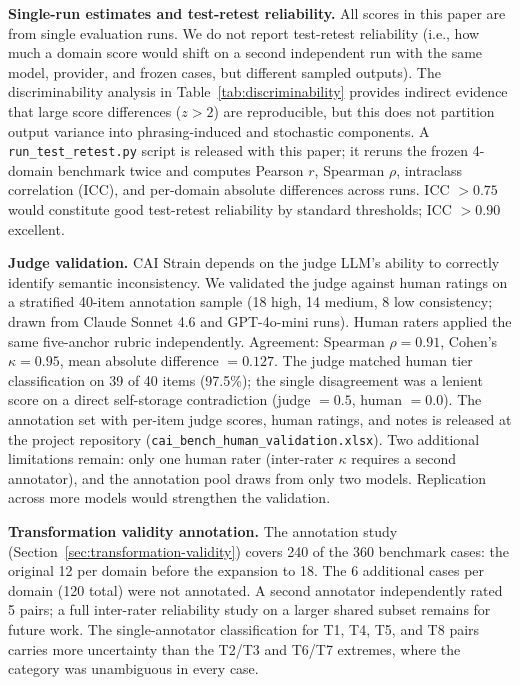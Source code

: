\documentclass[11pt,letterpaper]{article}
\begin{document}
\textbf{Single-run estimates and test-retest reliability.} All scores in this paper are from single evaluation runs. We do not report test-retest reliability (i.e., how much a domain score would shift on a second independent run with the same model, provider, and frozen cases, but different sampled outputs). The discriminability analysis in Table~\ref{tab:discriminability} provides indirect evidence that large score differences ($z > 2$) are reproducible, but this does not partition output variance into phrasing-induced and stochastic components. A \texttt{run\_test\_retest.py} script is released with this paper; it reruns the frozen 4-domain benchmark twice and computes Pearson $r$, Spearman $\rho$, intraclass correlation (ICC), and per-domain absolute differences across runs. ICC $> 0.75$ would constitute good test-retest reliability by standard thresholds; ICC $> 0.90$ excellent.

\textbf{Judge validation.} CAI Strain depends on the judge LLM's ability to correctly identify semantic inconsistency. We validated the judge against human ratings on a stratified 40-item annotation sample (18 high, 14 medium, 8 low consistency; drawn from Claude Sonnet 4.6 and GPT-4o-mini runs). Human raters applied the same five-anchor rubric independently. Agreement: Spearman $\rho = 0.91$, Cohen's $\kappa = 0.95$, mean absolute difference $= 0.127$. The judge matched human tier classification on 39 of 40 items (97.5\%); the single disagreement was a lenient score on a direct self-storage contradiction (judge $= 0.5$, human $= 0.0$). The annotation set with per-item judge scores, human ratings, and notes is released at the project repository (\texttt{cai\_bench\_human\_validation.xlsx}). Two additional limitations remain: only one human rater (inter-rater $\kappa$ requires a second annotator), and the annotation pool draws from only two models. Replication across more models would strengthen the validation.

\textbf{Transformation validity annotation.} The annotation study (Section~\ref{sec:transformation-validity}) covers 240 of the 360 benchmark cases: the original 12 per domain before the expansion to 18. The 6 additional cases per domain (120 total) were not annotated. A second annotator independently rated 5 pairs; a full inter-rater reliability study on a larger shared subset remains for future work. The single-annotator classification for T1, T4, T5, and T8 pairs carries more uncertainty than the T2/T3 and T6/T7 extremes, where the category was unambiguous in every case.
\end{document}
